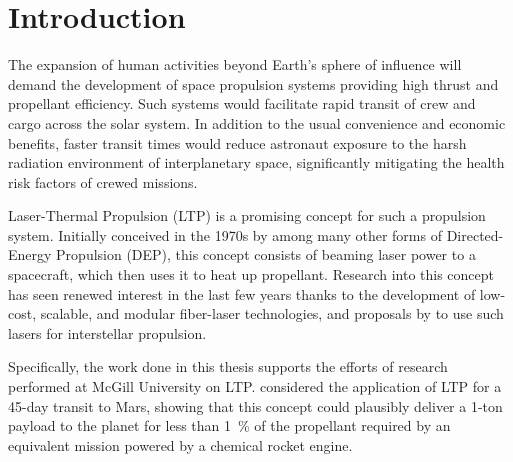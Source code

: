 \chapter{Introduction}
    The expansion of human activities beyond Earth's sphere of influence will demand the development of space propulsion systems providing high thrust and propellant efficiency. Such systems would facilitate rapid transit of crew and cargo across the solar system. In addition to the usual convenience and economic benefits, faster transit times would reduce astronaut exposure to the harsh radiation environment of interplanetary space, significantly mitigating the health risk factors of crewed missions.

    Laser-Thermal Propulsion (LTP) is a promising concept for such a propulsion system. Initially conceived in the 1970s by \textcite{kantrowitz_relevance_2015} among many other forms of Directed-Energy Propulsion (DEP), this concept consists of beaming laser power to a spacecraft, which then uses it to heat up propellant. Research into this concept has seen renewed interest in the last few years thanks to the development of low-cost, scalable, and modular fiber-laser technologies, and proposals by \textcite{lubin_roadmap_2022} to use such lasers for interstellar propulsion.

    Specifically, the work done in this thesis supports the efforts of research performed at McGill University on LTP. \textcite{duplay_design_2022} considered the application of LTP for a 45-day transit to Mars, showing that this concept could plausibly deliver a 1-ton payload to the planet for less than 1~\% of the propellant required by an equivalent mission powered by a chemical rocket engine.